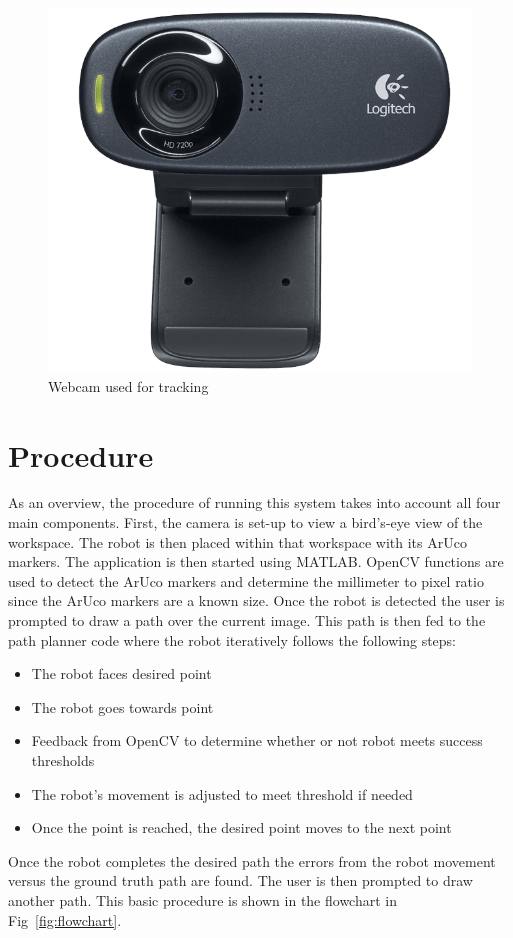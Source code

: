 \documentclass[12pt,american]{report}
\begin{document}
\begin{figure}[h!]
\centering
\includegraphics[scale=.15]{images/webcam.png}
\caption{Webcam used for tracking}
\label{fig:webcam}
\end{figure}

\section{Procedure}
As an overview, the procedure of running this system takes into account all four main components.  First, the camera is set-up to view a bird's-eye view of the workspace.  The robot is then placed within that workspace with its ArUco markers. The application is then started using MATLAB. OpenCV functions are used to detect the ArUco markers and determine the millimeter to pixel ratio since the ArUco markers are a known size. Once the robot is detected the user is prompted to draw a path over the current image. This path is then fed to the path planner code where the robot iteratively follows the following steps:
\begin{itemize}
\item The robot faces desired point
\item The robot goes towards point
\item Feedback from OpenCV to determine whether or not robot meets success thresholds
\item The robot's movement is adjusted to meet threshold if needed
\item Once the point is reached, the desired point moves to the next point
\end{itemize}
Once the robot completes the desired path the errors from the robot movement versus the ground truth path are found.  The user is then prompted to draw another path. This basic procedure is shown in the flowchart in Fig~\ref{fig:flowchart}.
\end{document}
